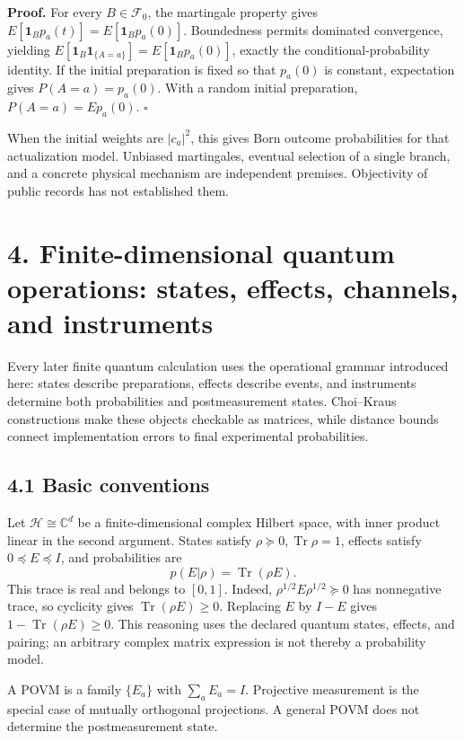 \documentclass[
  11pt,
  oneside]{book}
\begin{document}
\textbf{Proof.} For every \(B\in\mathcal F_0\), the martingale property
gives \(E[\mathbf1_Bp_a(t)]=E[\mathbf1_Bp_a(0)]\). Boundedness permits
dominated convergence, yielding
\(E[\mathbf1_B\mathbf1_{\{A=a\}}]=E[\mathbf1_Bp_a(0)]\), exactly the
conditional-probability identity. If the initial preparation is fixed so
that \(p_a(0)\) is constant, expectation gives \(P(A=a)=p_a(0)\). With a
random initial preparation, \(P(A=a)=Ep_a(0)\). \(\square\)

When the initial weights are \(|c_a|^2\), this gives Born outcome
probabilities for that actualization model. Unbiased martingales,
eventual selection of a single branch, and a concrete physical mechanism
are independent premises. Objectivity of public records has not
established them.

\chapter{4. Finite-dimensional quantum operations: states, effects,
channels, and instruments}\label{ch-4}

Every later finite quantum calculation uses the operational grammar
introduced here: states describe preparations, effects describe events,
and instruments determine both probabilities and postmeasurement states.
Choi--Kraus constructions make these objects checkable as matrices,
while distance bounds connect implementation errors to final
experimental probabilities.

\section{4.1 Basic conventions}

Let \(\mathcal H\cong\mathbb C^d\) be a finite-dimensional complex
Hilbert space, with inner product linear in the second argument. States
satisfy \(\rho\succeq0,\operatorname{Tr}\rho=1\), effects satisfy
\(0\preceq E\preceq I\), and probabilities are \[
p(E|\rho)=\operatorname{Tr}(\rho E).
\] This trace is real and belongs to \([0,1]\). Indeed,
\(\rho^{1/2}E\rho^{1/2}\succeq0\) has nonnegative trace, so cyclicity
gives \(\operatorname{Tr}(\rho E)\ge0\). Replacing \(E\) by \(I-E\)
gives \(1-\operatorname{Tr}(\rho E)\ge0\). This reasoning uses the
declared quantum states, effects, and pairing; an arbitrary complex
matrix expression is not thereby a probability model.

A POVM is a family \(\{E_a\}\) with \(\sum_aE_a=I\). Projective
measurement is the special case of mutually orthogonal projections. A
general POVM does not determine the postmeasurement state.
\end{document}
